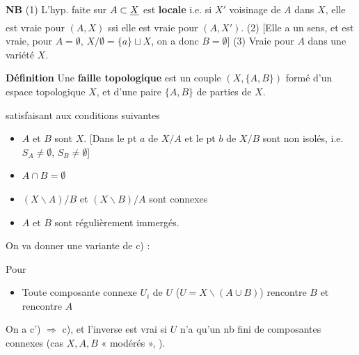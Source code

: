 \documentclass[11pt,a4paper]{article}
\begin{document}
\textbf{NB} (1) L'hyp. faite sur $A \subset \struck{X}$ est \textbf{locale} i.e.  si $X'$ voisinage de $A$ dans $X$, elle est vraie pour $(A,X)$ ssi elle est vraie pour $(A,X')$. (2) [Elle a un sens, et est vraie, pour $A = \emptyset$, $X/\emptyset = \{a\} \sqcup X$, on a donc $B = \emptyset$] (3) Vraie pour $A$  \ill{} \struck{\ill{}} \ill{} dans une variété $X$.

\textbf{Définition}  Une \textbf{faille topologique} est un couple $(X, \{A,B\})$ formé d'un espace topologique $X$, et d'une paire $\{A,B\}$ \ill{} de parties de $X$.

satisfaisant aux conditions suivantes


\begin{itemize}
  \item[Fi a)] $A$ et $B$ sont    $X$. [Dans le pt $a$ de $X/A$ et le pt $b$ de $X/B$ sont non isolés, i.e. $S_A \neq \emptyset$, $S_B \neq \emptyset$]
  \item[Fi b)] \struck{\ill{}} $A \cap B = \emptyset$
  \item[Fi c)] $(X \smallsetminus A)/B$ et $(X \smallsetminus B)/A$ sont connexes
  \item[Fi d)] $A$ et $B$ sont régulièrement immergés. 
\end{itemize}

On va donner \struck{\ill{}} une variante de c) :

 Pour

\begin{itemize}
  \item[c')] Toute composante connexe $U_i$ de $U$ ($U = X \smallsetminus (A \cup B)$) rencontre $B$ et rencontre $A$ 
\end{itemize}

On a c') $\Longrightarrow$ c), et l'inverse est vrai si $U$ n'a qu'un nb fini de composantes connexes (cas $X, A, B$ « modérés », ).
\end{document}
